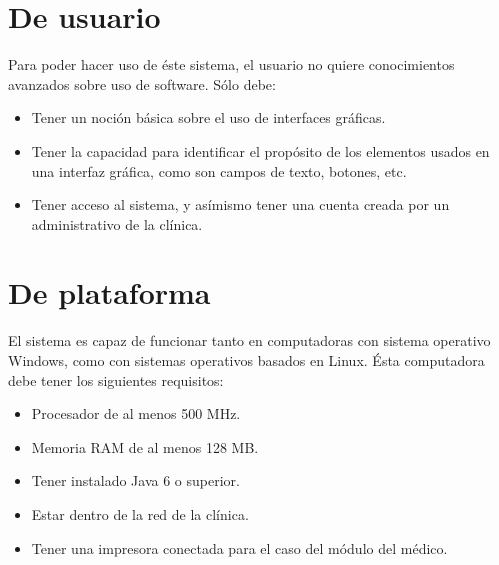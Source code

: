 

\section{De usuario}
Para poder hacer uso de \'este sistema, el usuario no quiere conocimientos avanzados sobre uso de software. S\'olo debe:
\begin{itemize}
\item Tener un noci\'on b\'asica sobre el uso de interfaces gr\'aficas.
\item Tener la capacidad para identificar el prop\'osito de los elementos usados en una interfaz gr\'afica, como son campos de texto, botones, etc.
\item Tener acceso al sistema, y as\'imismo tener una cuenta creada por un administrativo de la cl\'inica.
\end{itemize}
\section{De plataforma}
El sistema es capaz de funcionar tanto en computadoras con sistema operativo Windows, como con sistemas operativos basados en Linux. \'Esta computadora debe tener los siguientes requisitos:
\begin{itemize}
\item Procesador de al menos 500 MHz.
\item Memoria RAM de al menos 128 MB.
\item Tener instalado Java 6 o superior.
\item Estar dentro de la red de la cl\'inica.
\item Tener una impresora conectada para el caso del m\'odulo del m\'edico.
\end{itemize}